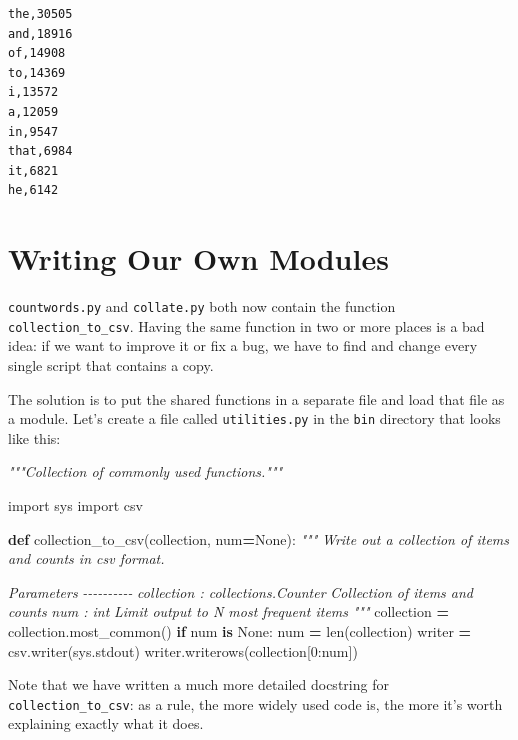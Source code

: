 \documentclass[
]{krantz}
\makeatletter
\newenvironment{Shaded}{\begin{snugshade}}{\end{snugshade}}
\newcommand{\BuiltInTok}[1]{#1}
\newcommand{\CommentTok}[1]{\textcolor[rgb]{0.56,0.35,0.01}{\textit{#1}}}
\newcommand{\ControlFlowTok}[1]{\textcolor[rgb]{0.13,0.29,0.53}{\textbf{#1}}}
\newcommand{\DecValTok}[1]{\textcolor[rgb]{0.00,0.00,0.81}{#1}}
\newcommand{\ImportTok}[1]{#1}
\newcommand{\KeywordTok}[1]{\textcolor[rgb]{0.13,0.29,0.53}{\textbf{#1}}}
\newcommand{\NormalTok}[1]{#1}
\newcommand{\OperatorTok}[1]{\textcolor[rgb]{0.81,0.36,0.00}{\textbf{#1}}}
\newcommand{\VariableTok}[1]{\textcolor[rgb]{0.00,0.00,0.00}{#1}}
\newenvironment{kframe}{%
\medskip{}
\setlength{\fboxsep}{.8em}
 \def\at@end@of@kframe{}%
 \ifinner\ifhmode%
  \def\at@end@of@kframe{\end{minipage}}%
  \begin{minipage}{\columnwidth}%
 \fi\fi%
 \def\FrameCommand##1{\hskip\@totalleftmargin \hskip-\fboxsep
 \colorbox{shadecolor}{##1}\hskip-\fboxsep
     \hskip-\linewidth \hskip-\@totalleftmargin \hskip\columnwidth}%
 \MakeFramed {\advance\hsize-\width
   \@totalleftmargin\z@ \linewidth\hsize
   \@setminipage}}%
 {\par\unskip\endMakeFramed%
 \at@end@of@kframe}
\renewenvironment{Shaded}{\begin{kframe}}{\end{kframe}}
\makeatother
\begin{document}
\begin{verbatim}
the,30505
and,18916
of,14908
to,14369
i,13572
a,12059
in,9547
that,6984
it,6821
he,6142
\end{verbatim}

\hypertarget{py-rse-py-scripting-modules}{%
\section{Writing Our Own Modules}\label{py-rse-py-scripting-modules}}

\texttt{countwords.py} and \texttt{collate.py} both now contain the function \texttt{collection\_to\_csv}.
Having the same function in two or more places is a bad idea:
if we want to improve it or fix a bug,
we have to find and change every single script that contains a copy.

The solution is to put the shared functions in a separate file
and load that file as a module.
Let's create a file called \texttt{utilities.py} in the \texttt{bin} directory
that looks like this:

\begin{Shaded}
\begin{Highlighting}[]
\CommentTok{"""Collection of commonly used functions."""}

\ImportTok{import}\NormalTok{ sys}
\ImportTok{import}\NormalTok{ csv}

\KeywordTok{def}\NormalTok{ collection\_to\_csv(collection, num}\OperatorTok{=}\VariableTok{None}\NormalTok{):}
    \CommentTok{"""}
\CommentTok{    Write out a collection of items and counts in csv format.}

\CommentTok{    Parameters}
\CommentTok{    {-}{-}{-}{-}{-}{-}{-}{-}{-}{-}}
\CommentTok{    collection : collections.Counter}
\CommentTok{        Collection of items and counts}
\CommentTok{    num : int}
\CommentTok{        Limit output to N most frequent items}
\CommentTok{    """}
\NormalTok{    collection }\OperatorTok{=}\NormalTok{ collection.most\_common()}
    \ControlFlowTok{if}\NormalTok{ num }\KeywordTok{is} \VariableTok{None}\NormalTok{:}
\NormalTok{        num }\OperatorTok{=} \BuiltInTok{len}\NormalTok{(collection)}
\NormalTok{    writer }\OperatorTok{=}\NormalTok{ csv.writer(sys.stdout)}
\NormalTok{    writer.writerows(collection[}\DecValTok{0}\NormalTok{:num])}
\end{Highlighting}
\end{Shaded}

Note that we have written a much more detailed docstring for \texttt{collection\_to\_csv}:
as a rule,
the more widely used code is,
the more it's worth explaining exactly what it does.
\end{document}

